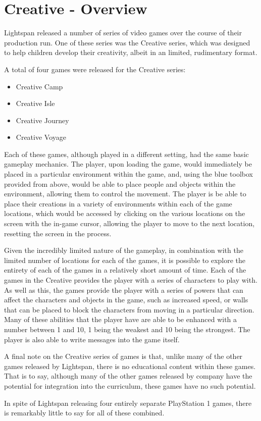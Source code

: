 \chapter{Creative - Overview}

Lightspan released a number of series of video games over the course of their production run.
One of these series was the Creative series, which was designed to help children develop their creativity, albeit in an limited, rudimentary format.

A total of four games were released for the Creative series:

\begin{itemize}
    \item Creative Camp
    \item Creative Isle
    \item Creative Journey
    \item Creative Voyage
\end{itemize}

Each of these games, although played in a different setting, had the same basic gameplay mechanics.
The player, upon loading the game, would immediately be placed in a particular environment within the game, and, using the blue toolbox provided from above, would be able to place people and objects within the environment, allowing them to control the movement.
The player is be able to place their creations in a variety of environments within each of the game locations, which would be accessed by clicking on the various locations on the screen with the in-game cursor, allowing the player to move to the next location, resetting the screen in the process.

Given the incredibly limited nature of the gameplay, in combination with the limited number of locations for each of the games, it is possible to explore the entirety of each of the games in a relatively short amount of time.
Each of the games in the Creative provides the player with a series of characters to play with.
As well as this, the games provide the player with a series of powers that can affect the characters and objects in the game, such as increased speed, or walls that can be placed to block the characters from moving in a particular direction.
Many of these abilities that the player have are able to be enhanced with a number between 1 and 10, 1 being the weakest and 10 being the strongest.
The player is also able to write messages into the game itself.

A final note on the Creative series of games is that, unlike many of the other games released by Lightspan, there is no educational content within these games.
That is to say, although many of the other games released by company have the potential for integration into the curriculum, these games have no such potential.

In spite of Lightspan releasing four entirely separate PlayStation 1 games, there is remarkably little to say for all of these combined.